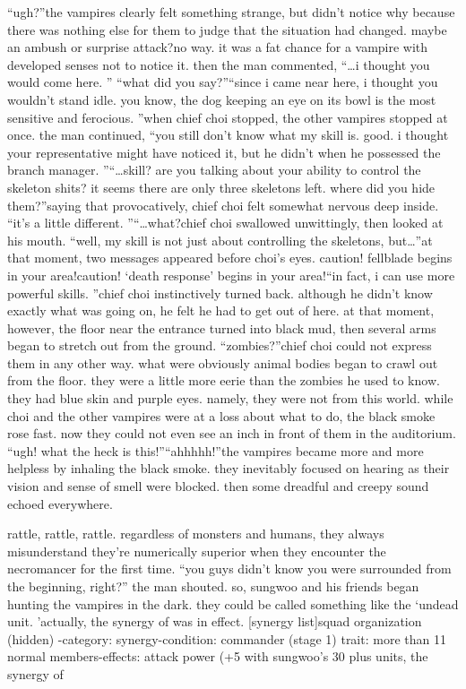 “ugh?”the vampires clearly felt something strange, but didn’t notice why because there was nothing else for them to judge that the situation had changed.
 maybe an ambush or surprise attack?no way.
 it was a fat chance for a vampire with developed senses not to notice it.
then the man commented, “…i thought you would come here.
”
“what did you say?”“since i came near here, i thought you wouldn’t stand idle.
 you know, the dog keeping an eye on its bowl is the most sensitive and ferocious.
”when chief choi stopped, the other vampires stopped at once.
the man continued, “you still don’t know what my skill is.
 good.
 i thought your representative might have noticed it, but he didn’t when he possessed the branch manager.
”“…skill? are you talking about your ability to control the skeleton shits? it seems there are only three skeletons left.
 where did you hide them?”saying that provocatively, chief choi felt somewhat nervous deep inside.
“it’s a little different.
”“…what?chief choi swallowed unwittingly, then looked at his mouth.
“well, my skill is not just about controlling the skeletons, but…”at that moment, two messages appeared before choi’s eyes.
caution! fellblade begins in your area!caution! ‘death response’ begins in your area!“in fact, i can use more powerful skills.
”chief choi instinctively turned back.
 although he didn’t know exactly what was going on, he felt he had to get out of here.
 at that moment, however, the floor near the entrance turned into black mud, then several arms began to stretch out from the ground.
“zombies?”chief choi could not express them in any other way.
 what were obviously animal bodies began to crawl out from the floor.
 they were a little more eerie than the zombies he used to know.
 they had blue skin and purple eyes.
 namely, they were not from this world.
while choi and the other vampires were at a loss about what to do, the black smoke rose fast.
 now they could not even see an inch in front of them in the auditorium.
“ugh! what the heck is this!”“ahhhhh!”the vampires became more and more helpless by inhaling the black smoke.
 they inevitably focused on hearing as their vision and sense of smell were blocked.
 then some dreadful and creepy sound echoed everywhere.


rattle, rattle, rattle.
regardless of monsters and humans, they always misunderstand they’re numerically superior when they encounter the necromancer for the first time.
“you guys didn’t know you were surrounded from the beginning, right?” the man shouted.
so, sungwoo and his friends began hunting the vampires in the dark.
they could be called something like the ‘undead unit.
’actually, the synergy of  was in effect.
[synergy list]squad organization (hidden) -category: synergy-condition: commander (stage 1) trait: more than 11 normal members-effects: attack power (+5%
 with sungwoo’s 30 plus units, the synergy of

 